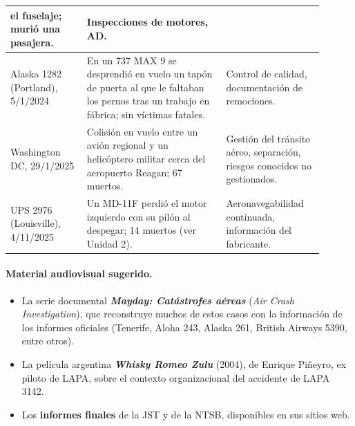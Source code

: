 \begin{center}
\begin{tabular}{|p{0.22\linewidth}|p{0.40\linewidth}|p{0.28\linewidth}|}
el fuselaje; murió una pasajera. & Inspecciones de motores, AD. \\ \hline
Alaska 1282 (Portland), 5/1/2024 & En un 737 MAX 9 se desprendió en vuelo un tapón de puerta al
que le faltaban los pernos tras un trabajo en fábrica; sin víctimas fatales. & Control de
calidad, documentación de remociones. \\ \hline
Washington DC, 29/1/2025 & Colisión en vuelo entre un avión regional y un helicóptero militar
cerca del aeropuerto Reagan; 67 muertos. & Gestión del tránsito aéreo, separación, riesgos
conocidos no gestionados. \\ \hline
UPS 2976 (Louisville), 4/11/2025 & Un MD-11F perdió el motor izquierdo con su pilón al despegar;
14 muertos (ver Unidad 2). & Aeronavegabilidad continuada, información del fabricante. \\
\hline
\end{tabular}
\end{center}

\paragraph*{Material audiovisual sugerido.}
\begin{itemize}
  \item La serie documental \textbf{\textit{Mayday: Catástrofes aéreas}} (\textit{Air Crash
        Investigation}), que reconstruye muchos de estos casos con la información de los
        informes oficiales (Tenerife, Aloha 243, Alaska 261, British Airways 5390, entre otros).
  \item La película argentina \textbf{\textit{Whisky Romeo Zulu}} (2004), de Enrique Piñeyro,
        ex piloto de LAPA, sobre el contexto organizacional del accidente de LAPA 3142.
  \item Los \textbf{informes finales} de la JST y de la NTSB, disponibles en sus sitios web.
\end{itemize}

